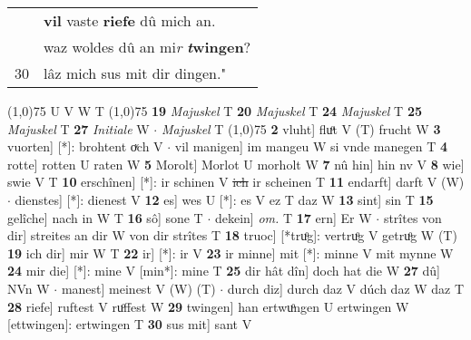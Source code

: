 \documentclass[8pt,a4paper,notitlepage]{article}
\begin{document}
\begin{table}[ht]
\begin{minipage}[t]{0.5\linewidth}
\begin{tabular}{rl}
 & \textbf{vil} vaste \textbf{riefe} dû mich an.\\ 
 & waz woldes dû an mi\textit{r} \textbf{\textit{t}wingen}?\\ 
30 & lâz mich sus mit dir dingen."\\ 
\end{tabular}
\scriptsize
\line(1,0){75} \newline
U V W T \newline
\line(1,0){75} \newline
\textbf{19} \textit{Majuskel} T  \textbf{20} \textit{Majuskel} T  \textbf{24} \textit{Majuskel} T  \textbf{25} \textit{Majuskel} T  \textbf{27} \textit{Initiale} W   $\cdot$ \textit{Majuskel} T  \newline
\line(1,0){75} \newline
\textbf{2} vluht] fluͦt V (T) frucht W \textbf{3} vuorten] [*]: brohtent oͮch V  $\cdot$ vil manigen] im mangeu W si vnde manegen T \textbf{4} rotte] rotten U raten W \textbf{5} Morolt] Morlot U morholt W \textbf{7} nû hin] hin nv V \textbf{8} wie] swie V T \textbf{10} erschînen] [*]: ir schinen V \sout{ich} ir scheinen T \textbf{11} endarft] darft V (W)  $\cdot$ dienstes] [*]: dienest V \textbf{12} es] wes U [*]: es V ez T daz W \textbf{13} sint] sin T \textbf{15} gelîche] nach in W T \textbf{16} sô] sone T  $\cdot$ dekein] \textit{om.} T \textbf{17} ern] Er W  $\cdot$ strîtes von dir] streites an dir W von dir strîtes T \textbf{18} truoc] [*truͦg]: vertruͦg V getruͦg W (T) \textbf{19} ich dir] mir W T \textbf{22} ir] [*]: ir V \textbf{23} ir minne] mit [*]: minne V mit mynne W \textbf{24} mir die] [*]: mine V [min*]: mine T \textbf{25} dir hât dîn] doch hat die W \textbf{27} dû] NVn W  $\cdot$ manest] meinest V (W) (T)  $\cdot$ durch diz] durch daz V dúch daz W daz T \textbf{28} riefe] ruftest V ruͦffest W \textbf{29} twingen] han ertwuͦngen U ertwingen W [ettwingen]: ertwingen T \textbf{30} sus mit] sant V \newline
\end{minipage}
\end{table}
\end{document}
